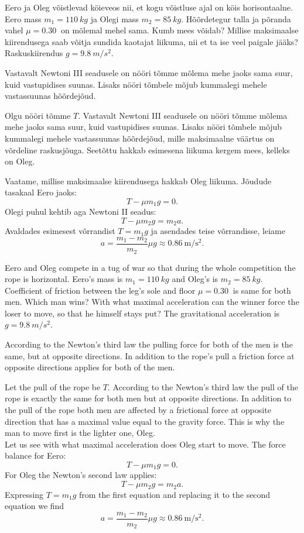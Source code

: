 
Eero ja Oleg võistlevad köieveos nii, et kogu võistluse ajal on köis horisontaalne. Eero mass $m_1=\SI{110}{kg}$ ja Olegi mass $m_2=\SI{85}{kg}$. Hõõrdetegur talla ja põranda vahel $\mu=\SI{0,30}{}$ on mõlemal mehel sama. Kumb mees võidab? Millise maksimaalse kiirendusega saab võitja sundida kaotajat liikuma, nii et ta ise veel paigale jääks? Raskuskiirendus $g=\SI{9,8}{m/s^2}$.

\hint
Vastavalt Newtoni III seadusele on nööri tõmme mõlema mehe jaoks sama suur, kuid vastupidises suunas. Lisaks nööri tõmbele mõjub kummalegi mehele vastassuunas hõõrdejõud.

\solu
Olgu nööri tõmme $T$. Vastavalt Newtoni III seadusele on nööri tõmme mõlema mehe jaoks sama suur, kuid vastupidises suunas. Lisaks nööri tõmbele mõjub kummalegi mehele vastassuunas hõõrdejõud, mille maksimaalne väärtus on võrdeline raskusjõuga. Seetõttu hakkab esimesena liikuma kergem mees, kelleks on Oleg.

Vaatame, millise maksimaalse kiirendusega hakkab Oleg liikuma.
Jõudude tasakaal Eero jaoks:
\[
T-\mu m_1g = 0.
\]
Olegi puhul kehtib aga Newtoni II seadus:
\[
T-\mu m_2g = m_2a.
\]
Avaldades esimesest võrrandist $T=m_1g$ ja asendades teise võrrandisse, leiame
\[
a = \frac{m_1-m_2}{m_2}\mu g \approx \SI{0,86}{\meter \per \second\squared}.
\]

Eero and Oleg compete in a tug of war so that during the whole competition the rope is horizontal. Eero’s mass is $m_1=\SI{110}{kg}$ and Oleg’s is $m_2=\SI{85}{kg}$. Coefficient of friction between the leg’s sole and floor $\mu=\SI{0,30}{}$ is same for both men. Which man wins? With what maximal acceleration can the winner force the loser to move, so that he himself stays put? The gravitational acceleration is $g=\SI{9,8}{m/s^2}$.

\hinteng
According to the Newton’s third law the pulling force for both of the men is the same, but at opposite directions. In addition to the rope’s pull a friction force at opposite directions applies for both of the men.

\solueng
Let the pull of the rope be $T$. According to the Newton’s third law the pull of the rope is exactly the same for both men but at opposite directions. In addition to the pull of the rope both men are affected by a frictional force at opposite direction that has a maximal value equal to the gravity force. This is why the man to move first is the lighter one, Oleg.\\
Let us see with what maximal acceleration does Oleg start to move. The force balance for Eero:
\[
T-\mu m_1g = 0.
\]
For Oleg the Newton’s second law applies:
\[
T-\mu m_2g = m_2a.
\]
Expressing $T=m_1g$ from the first equation and replacing it to the second equation we find
\[
a = \frac{m_1-m_2}{m_2}\mu g \approx \SI{0,86}{\meter \per \second\squared}.
\]
\probend